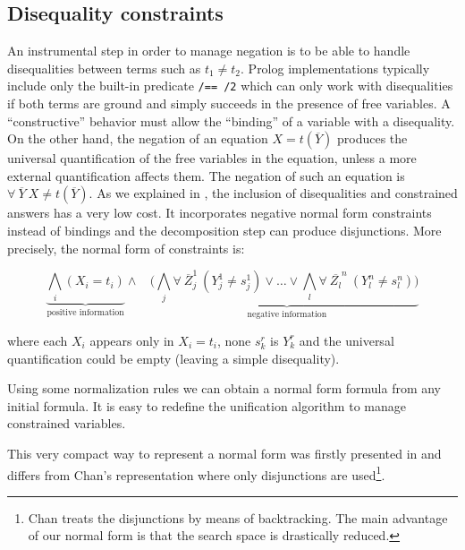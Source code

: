 \documentclass{llncs}
\begin{document}


\subsection{Disequality constraints}
\label{disequality}

An instrumental step in order to manage negation 
is to be able to handle disequalities between terms such as $t_1
\neq t_2$.  Prolog implementations typically include only the built-in
predicate {\tt /== /2} %
 which can only work with disequalities if both
terms are ground and simply succeeds in the presence of free variables.
A ``constructive'' behavior must allow the ``binding'' of a variable
with a disequality. On the other hand, the
negation of an equation $X = t(\overline{Y})$ produces the universal
quantification of the free variables in the equation, unless a more
external quantification affects them. The negation of such an equation
is $\forall~ \overline{Y}~X \neq t(\overline{Y})$.
As we explained in \cite{SusanaPADL2000}, the inclusion of
disequalities and constrained answers has a very low cost. It
incorporates negative normal form constraints instead of bindings and
the decomposition step can produce disjunctions. More precisely, the
normal form of constraints is:

\[ \underbrace{\bigwedge_i (X_i = t_i)}_{\mbox{positive information}} \wedge~~~~ (
\underbrace{\bigwedge_j \forall~ \overline{Z}_j^1~(Y_j^1 \neq s_j^1)
\vee \ldots \vee \bigwedge_l \forall~ \overline{Z_l}^n~(Y_l^n
\neq s_l^n) )}_{\mbox{negative information}} \]

\noindent
where each $X_i$ appears only in $X_i = t_i$, none $s_k^r$ is $Y_k^r$
and the universal quantification could be
empty (leaving a simple disequality).

Using some normalization rules we can obtain a normal form
formula from any initial formula. It is easy to redefine
the unification algorithm to manage constrained variables.

This very compact way to represent a normal form was firstly presented in
\cite{Moreno1} and differs from Chan's representation where
only disjunctions are used\footnote{Chan treats the disjunctions
by means of backtracking. The main advantage of our normal form is
that the search space is drastically reduced.}.
\end{document}
